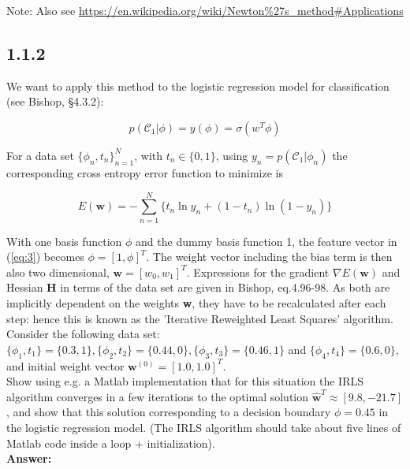 \documentclass[a4paper]{article}
\begin{document}
Note: Also see \url{https://en.wikipedia.org/wiki/Newton%27s_method#Applications}


\subsection*{1.1.2}


We want to apply this method to the logistic regression model for classification (see Bishop, §4.3.2):

\begin{equation}  \label{eq:3}
p(\mathcal{C}_1 | \phi ) = y(\phi) = \sigma(w^T \phi)
\end{equation}

For a data set $\{ \phi_n, t_n\}^N_{n=1}$, with $t_n \in \{ 0,1 \}$, using $y_n = p(\mathcal{C}_1 | \phi_n)$ the corresponding cross entropy error function to minimize is 

\begin{equation}  \label{eq:4}
E(\textbf{w}) = - \sum^N_{n=1} \{ t_n \ln y_n + (1 - t_n) \ln(1 - y_n)\}
\end{equation}

With one basis function $\phi$ and the dummy basis function 1, the feature vector in (\ref{eq:3}) becomes $\phi = [1, \phi]^T$. The weight vector including the bias term is then also two dimensional, $\textbf{w} = [w_0,w_1]^T$.
Expressions for the gradient $\nabla E(\textbf{w})$ and Hessian \textbf{H} in terms of the data set are given in Bishop, eq.4.96-98. As both are implicitly dependent on the weights \textbf{w}, they have to be recalculated after each step: hence this is known as the 'Iterative Reweighted Least Squares' algorithm.\\

Consider the following data set: $\{ \phi_1, t_1 \} = \{0.3, 1 \}, \{ \phi_2, t_2 \} = \{ 0.44, 0 \}, \{ \phi_3, t_3 \} = \{ 0.46, 1 \}$ and $\{ \phi_4, t_4 \} = \{ 0.6, 0 \}$, and initial weight vector $\textbf{w}^{(0)} = [1.0, 1.0]^T$.\\

Show using e.g. a Matlab implementation that for this situation the IRLS algorithm converges in a few iterations to the optimal solution $\hat{\textbf{w}}^T \approx [9.8, -21.7]$, and show that this solution corresponding to a decision boundary $\phi = 0.45$ in the logistic regression model. (The IRLS algorithm should take about five lines of Matlab code inside a loop + initialization).\\


\textbf{Answer:}\\
\end{document}
